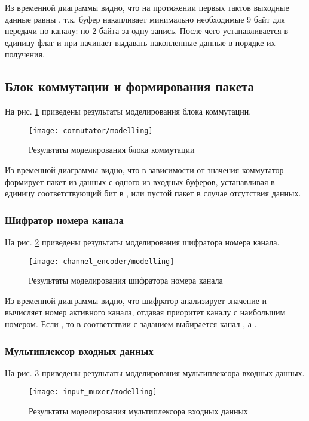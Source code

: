 Из временной диаграммы видно, что на протяжении первых тактов  выходные данные равны , т.к. буфер накапливает минимально необходимые 9 байт для передачи по каналу: по 2 байта за одну запись. После чего устанавливается в единицу флаг  и при  начинает выдавать накопленные данные в порядке их получения.

\subsection{Блок коммутации и формирования пакета}

На рис. \ref{fig:commutator_modelling} приведены результаты моделирования блока коммутации.
\begin{figure}[H]
	\centering
	\texttt{[image: commutator/modelling]}
	\caption{Результаты моделирования блока коммутации}
	\label{fig:commutator_modelling}
\end{figure}

Из временной диаграммы видно, что в зависимости от значения  коммутатор формирует пакет из данных с одного из входных буферов, устанавливая в единицу соответствующий бит в , или пустой пакет в случае отсутствия данных.

\subsubsection{Шифратор номера канала}

На рис. \ref{fig:channel_encoder_modelling} приведены результаты моделирования шифратора номера канала.
\begin{figure}[H]
	\centering
	\texttt{[image: channel\_encoder/modelling]}
	\caption{Результаты моделирования шифратора номера канала}
	\label{fig:channel_encoder_modelling}
\end{figure}

\noindent Из временной диаграммы видно, что шифратор анализирует значение  и вычисляет номер активного канала, отдавая приоритет каналу с наибольшим номером. Если , то в соответствии с заданием выбирается канал , а .

\subsubsection{Мультиплексор входных данных}

На рис. \ref{fig:input_muxer_modelling} приведены результаты моделирования мультиплексора входных данных.
\begin{figure}[H]
	\centering
	\texttt{[image: input\_muxer/modelling]}
	\caption{Результаты моделирования мультиплексора входных данных}
	\label{fig:input_muxer_modelling}
\end{figure}

